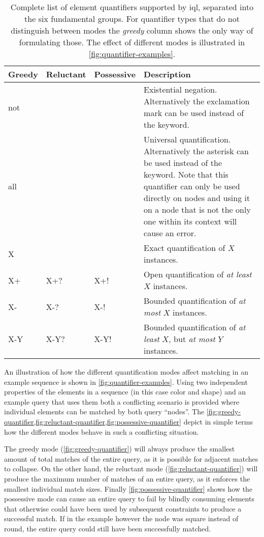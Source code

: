 \documentclass[11pt,a4paper]{report}
\begin{document}
\begin{table}[!htb]\centering
	\begin{tabular}{|p{}|p{}|p{}|p{}|}
		\hline 
		\textbf{Greedy} & \textbf{Reluctant} & \textbf{Possessive} & \textbf{Description} \\ 
		\hline 
		\hline  
		not &  &  & Existential negation. Alternatively the exclamation mark \lit{!} can be used instead of the \keyword{not} keyword. \\ 
		\hline  
		all &  &  & Universal quantification. Alternatively the asterisk \lit{*} can be used instead of the \keyword{all} keyword. Note that this quantifier can only be used directly on nodes and using it on a node that is not the only one within its context will cause an error. \\ 
		\hline 
		X &  &  & Exact quantification of $X$ instances. \\ 
		\hline 
		X+ & X+? & X+! & Open quantification of \textit{at least} $X$ instances. \\ 
		\hline 
		X- & X-? & X-! & Bounded quantification of \textit{at most} $X$ instances. \\ 
		\hline 
		X-Y & X-Y? & X-Y! & Bounded quantification of \textit{at least} $X$, but \textit{at most} $Y$ instances. \\ 
		\hline 
	\end{tabular}
	\caption[Node quantifiers]{Complete list of element quantifiers supported by \ac{iql}, separated into the six fundamental groups. For quantifier types that do not distinguish between modes the \textit{greedy} column shows the only way of formulating those. The effect of different modes is illustrated in \cref{fig:quantifier-examples}.}
	\label{tab:quantifiers}
\end{table}

An illustration of how the different quantification modes affect matching in an example sequence is shown in \cref{fig:quantifier-examples}.
Using two independent properties of the elements in a sequence (in this case color and shape) and an example query that uses them both a conflicting scenario is provided where individual elements can be matched by both query ``nodes''.
The \cref{fig:greedy-quantifier,fig:reluctant-quantifier,fig:possessive-quantifier} depict in simple terms how the different modes behave in such a conflicting situation.

The greedy mode (\ref{fig:greedy-quantifier}) will always produce the smallest amount of total matches of the entire query, as it is possible for adjacent matches to collapse.
On the other hand, the reluctant mode (\ref{fig:reluctant-quantifier}) will produce the maximum number of matches of an entire query, as it enforces the smallest individual match sizes.
Finally \cref{fig:possessive-quantifier} shows how the possessive mode can cause an entire query to fail by blindly consuming elements that otherwise could have been used by subsequent constraints to produce a successful match.
If in the example however the node  was square instead of round, the entire query could still have been successfully matched.
\end{document}
